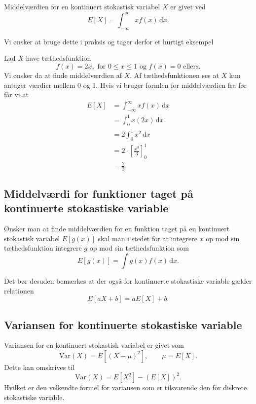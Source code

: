 \begin{sæt}
  Middelværdien for en kontinuert stokastisk variabel $X$ er givet ved
  \[ 
    E[X] = \int_{-\infty}^{\infty} xf(x) \, \mathrm{d}x 
  .\]
\end{sæt}

Vi ønsker at bruge dette i praksis og tager derfor et hurtigt eksempel

\begin{eks}
  Lad $X$ have tæthedsfunktion
  \[ 
    f(x) = 2x, \text{ for } 0\leq x\leq 1 \text{ og } f(x) = 0 \text{ ellers}
  .\]
  Vi ønsker da at finde middelværdien af $X$. Af tæthedsfunktionen ses at $X$ kun antager værdier mellem 0 og 1. Hvis vi bruger formlen for middelværdien fra før får vi at
  \begin{align*}
    E[X] &= \int_{-\infty}^{\infty} xf(x) \, \mathrm{d}x  \\
    &= \int_{0}^{1} x(2x) \, \mathrm{d}x  \\
    &= 2 \int_{0}^{1} x^2 \, \mathrm{d}x  \\
    &= 2 \cdot \left[ \frac{x^3}{3} \right]_0^{1} \\
    &= \frac{2}{3}
  .\end{align*}
\end{eks}

\subsection{Middelværdi for funktioner taget på kontinuerte stokastiske variable}

\begin{sæt}
  Ønsker man at finde middelværdien for en funktion taget på en kontinuert stokastisk variabel $E[g(x)]$ skal man i stedet for at integrere $x$ op mod sin tæthedsfunktion integrere $g$ op mod sin tæthedsfunktion som
  \[ 
    E[g(x)] = \int g(x) f(x) \, \mathrm{d}x  
  .\]
\end{sæt}

Det bør desuden bemærkes at der også for kontinuerte stokastiske variable gælder relationen
\[ 
  E[aX + b] = aE[X] + b
.\]

\subsection{Variansen for kontinuerte stokastiske variable}

\begin{definition}
  Variansen for en kontinuert stokastisk variabel er givet som
  \[ 
    \mathrm{Var}(X) = E \left[ (X - \mu)^2 \right], \qquad \mu = E[X]
  .\]
  Dette kan omskrives til
  \[ 
    \mathrm{Var}(X) = E \left[ X^2 \right] - (E[X])^2
  .\]
  Hvilket er den velkendte formel for variansen som er tilsvarende den for diskrete stokastiske variable.
\end{definition}


